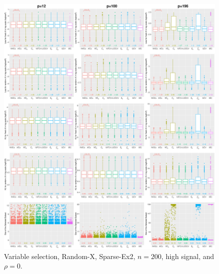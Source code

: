 \begin{figure}[!ht]
\centering
\includegraphics[width=\textwidth]{figures/supplement/randomx/subset_selection/Sparse-Ex2_n200_hsnr_rho0.eps}
\caption{Variable selection, Random-X, Sparse-Ex2, $n=200$, high signal, and $\rho=0$.}
\end{figure}
\clearpage
